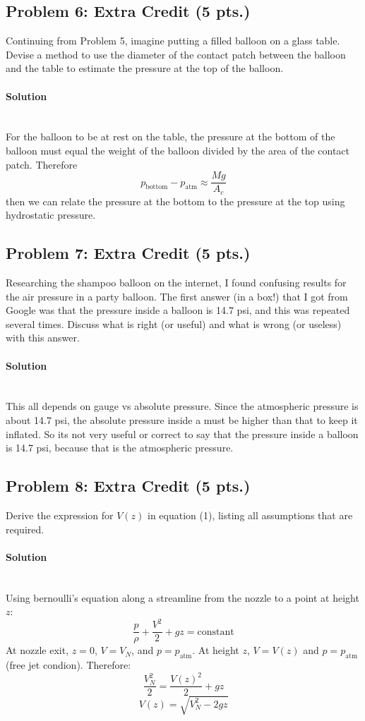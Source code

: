 \documentclass[12pt]{article}
\begin{document}
\subsection*{Problem 6: Extra Credit (5 pts.)}
Continuing from Problem 5, imagine putting a filled balloon on a glass table. Devise a method to use the diameter of the contact patch between the balloon and the table to estimate the pressure at the top of the balloon.

\paragraph{Solution}\mbox{}\\
For the balloon to be at rest on the table, the pressure at the bottom of the balloon must equal the weight of the balloon divided by the area of the contact patch. Therefore
\[
p_{\text{bottom}}-p_{\text{atm}}\approx\frac{Mg}{A_c}
\]
then we can relate the pressure at the bottom to the pressure at the top using hydrostatic pressure.

\subsection*{Problem 7: Extra Credit (5 pts.)}
Researching the shampoo balloon on the internet, I found confusing results for the air pressure in a party balloon. The first answer (in a box!) that I got from Google was that the pressure inside a balloon is 14.7 psi, and this was repeated several times. Discuss what is right (or useful) and what is wrong (or useless) with this answer.

\paragraph{Solution}\mbox{}\\
This all depends on gauge vs absolute pressure. Since the atmospheric pressure is about 14.7 psi, the absolute pressure inside a must be higher than that to keep it inflated. So its not very useful or correct to say that the pressure inside a balloon is 14.7 psi, because that is the atmospheric pressure. 

\subsection*{Problem 8: Extra Credit (5 pts.)}
Derive the expression for $V(z)$ in equation (1), listing all assumptions that are required.

\paragraph{Solution}\mbox{}\\
Using bernoulli's equation along a streamline from the nozzle to a point at height $z$:
\[
\frac{p}{\rho}+\frac{V^2}{2}+gz=\text{constant}
\]
At nozzle exit, $z=0$, $V=V_N$, and $p=p_\text{atm}$. At height $z$, $V=V(z)$ and $p=p_\text{atm}$ (free jet condion). Therefore:
\[
\frac{V_N^2}{2}=\frac{V(z)^2}{2}+gz
\]
\[
\boxed{V(z)=\sqrt{V_N^2-2gz}}
\]
\end{document}
